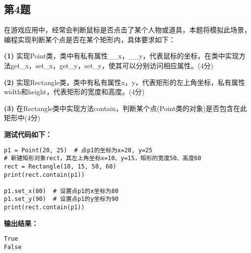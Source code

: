 \subsection{第4题}
在游戏应用中，经常会判断鼠标是否点击了某个人物或道具，本题将模拟此场景，编程实现判断某个点是否在某个矩形内，具体要求如下：

\textbf{(1)} 实现Point类，类中有私有属性\_\_x，\_\_y，代表鼠标的坐标，在类中实现方法get\_x，set\_x，get\_y，set\_y，使其可以分别访问相应属性。(4分)

\textbf{(2)} 实现Rectangle类，类中有私有属性x，y，代表矩形的左上角坐标，私有属性width和height，代表矩形的宽度和高度。(4分)

\textbf{(3)} 在Rectangle类中实现方法contain，判断某个点(Point类的对象)是否包含在此矩形中(4分)

\textbf{测试代码如下：}
\begin{lstlisting}
p1 = Point(20, 25)  # 点p1的坐标为x=20, y=25
# 新建矩形对象rect，其左上角坐标x=10、y=15，矩形的宽度50、高度60
rect = Rectangle(10, 15, 50, 60)
print(rect.contain(p1))

p1.set_x(80)  # 设置点p1的x坐标为80
p1.set_y(90)  # 设置点p1的y坐标为90
print(rect.contain(p1))
\end{lstlisting}

\textbf{输出结果：}
\begin{lstlisting}
True
False
\end{lstlisting}

